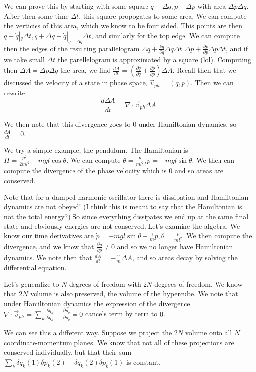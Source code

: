 \documentclass[10pt]{report}
\newcommand{\rd}[2]{\frac{d#1}{d#2}}
\newcommand{\pd}[2]{\frac{\partial #1}{\partial#2}}
\begin{document}
We can prove this by starting with some square $q+\Delta q, p + \Delta p$ with area $\Delta p \Delta q$. After then some time $\Delta t$, this square propogates to some area. We can compute the verticies of this area, which we know to be four sided. This points are then $q + \dot{q}|_q\Delta t, q+\Delta q + \dot{q}|_{q+\Delta q} \Delta t$, and similarly for the top edge. We can compute then the edges of the resulting parallelogram $\Delta q + \pd{\dot{q}}{q}\Delta q \Delta t, \Delta p + \pd{\dot{p}}{p}\Delta p \Delta t$, and if we take small $\Delta t$ the parellelogram is approximated by a square (lol). Computing then $\Delta A = \Delta p \Delta q$ the area, we find $\rd{A}{t} = \left( \pd{\dot{q}}{q} + \pd{\dot{p}}{p} \right)\Delta A$. Recall then that we discussed the velocity of a state in phase space, $\vec{v}_{ph} = (\dot{q}, \dot{p})$. Then we can rewrite
$$\rd{\Delta A}{t} = \nabla \cdot \vec{v}_{ph}\Delta A$$

We then note that this divergence goes to $0$ under Hamiltonian dynamics, so $\rd{A}{t} = 0$.

We try a simple example, the pendulum. The Hamiltonian is $H = \frac{p^2}{2ml^2}-mgl\cos \theta$. We can compute $\dot{\theta} = \frac{p}{ml^2}, \dot{p} = -mgl\sin\theta$. We then can compute the divergence of the phase velocity which is $0$ and so areas are conserved. 

Note that for a damped harmonic oscillator there is dissipation and Hamiltonian dynamics are not obeyed! (I think this is meant to say that the Hamiltonian is not the total energy?) So since everything dissipates we end up at the same final state and obviously energies are not conserved. Let's examine the algebra. We know our time derivatives are $\dot{p} = -mgl\sin\theta - \frac{\gamma}{m}p, \dot{\theta} = \frac{p}{ml^2}$. We then compute the divergence, and we know that $\pd{\dot{p}}{p} \neq 0$ and so we no longer have Hamiltonian dynamics. We note then that $\rd{A}{t} = -\frac{\gamma}{m}\Delta A$, and so areas decay by solving the differential equation. 

Let's generalize to $N$ degrees of freedom with $2N$ degrees of freedom. We know that $2N$ volume is also preserved, the volume of the hypercube. We note that under Hamiltonian dynamics the expression of the divergence $\nabla \cdot \vec{v}_{ph} = \sum_k \pd{\dot{q}_k}{q_k} + \pd{\dot{p}_k}{p_k} = 0$ cancels term by term to $0$. 

We can see this a different way. Suppose we project the $2N$ volume onto all $N$ coordinate-momentum planes. We know that not all of these projections are conserved individually, but that their sum $\sum_k \delta q_k(1) \delta p_k(2) - \delta q_k(2) \delta p_k(1)$ is constant.
\end{document}
